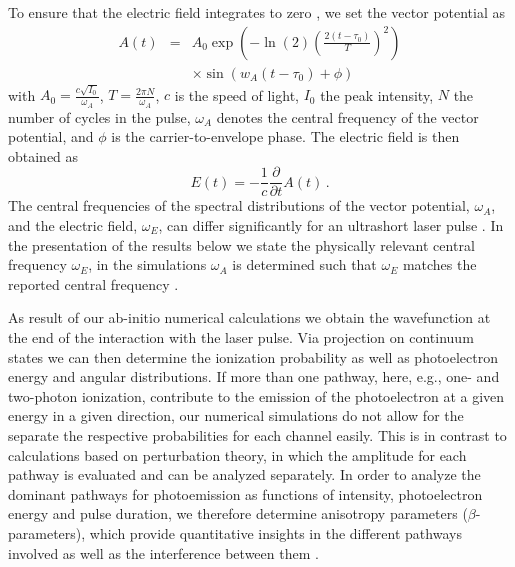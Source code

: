 To ensure that the electric field 
integrates to zero \cite{chelkowski02}, we set the vector potential as
%
\begin{eqnarray}
A(t) &=& 
      A_0 \exp\left(-\ln(2)\left(\frac{2(t-\tau_0)}{T}\right)^2\right)
      \nonumber
      \\
      && \times \sin\left(w_A(t-\tau_0)+\phi \right) 
      \label{eq:vectorp}
\end{eqnarray}
%
with $A_0 = \frac{c\sqrt{I_0}}{\omega_A}$, $T = \frac{2\pi N}{\omega_A}$, $c$ is the speed of light, $I_0$ the peak intensity, $N$ the number of cycles in the pulse, $\omega_A$ denotes the central frequency of the vector potential, and $\phi$ is the carrier-to-envelope phase. The electric field is then obtained as
\begin{equation}
    E(t) = -\frac{1}{c}\frac{\partial}{\partial t}A(t)\, .
    \label{eq:e-field}
\end{equation}
The central frequencies of the spectral distributions of the vector potential, $\omega_A$, and the electric field, $\omega_E$, can differ significantly for an ultrashort laser pulse \cite{venzke18freq}. In the presentation of the results below we state the physically relevant central frequency $\omega_E$, in the simulations $\omega_A$ is determined such that $\omega_E$ matches the reported central frequency \cite{venzke18freq}. 

As result of our ab-initio numerical calculations we obtain the wavefunction at the end of the interaction with the laser pulse. Via projection on continuum states we can then determine the ionization probability as well as photoelectron energy and angular distributions. If more than one pathway, here, e.g., one- and two-photon ionization, contribute to the emission of the photoelectron at a given energy in a given direction, our numerical simulations do not allow for the separate the respective probabilities for each channel easily. This is in contrast to calculations based on perturbation theory, in which the amplitude for each pathway is evaluated and can be analyzed separately. In order to analyze the dominant pathways for photoemission as functions of intensity, photoelectron energy and pulse duration, we therefore determine anisotropy parameters ($\beta$-parameters), which provide quantitative insights in the different pathways involved as well as the interference between them \cite{grum-grzhimailo15,douget16,boll19}.


